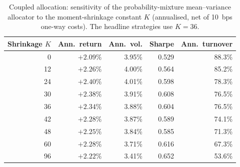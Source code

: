 \begin{table}[H]
\centering
\caption{Coupled allocation: sensitivity of the probability-mixture mean--variance allocator
to the moment-shrinkage constant $K$ (annualised, net of 10~bps one-way costs). The headline
strategies use $K=36$.}
\label{tab:c-shrinkage}
\small
\begin{tabular}{rrrrr}
\toprule
Shrinkage $K$ & Ann.\ return & Ann.\ vol. & Sharpe & Ann.\ turnover \\
\midrule
0  & $+2.09\%$ & 3.95\% & 0.529 & 88.3\% \\
12 & $+2.26\%$ & 4.00\% & 0.564 & 85.2\% \\
24 & $+2.40\%$ & 4.01\% & 0.598 & 78.3\% \\
30 & $+2.38\%$ & 3.91\% & 0.608 & 76.5\% \\
36 & $+2.34\%$ & 3.88\% & 0.604 & 76.5\% \\
42 & $+2.28\%$ & 3.87\% & 0.589 & 74.1\% \\
48 & $+2.25\%$ & 3.84\% & 0.585 & 71.3\% \\
60 & $+2.28\%$ & 3.71\% & 0.616 & 67.3\% \\
96 & $+2.22\%$ & 3.41\% & 0.652 & 53.6\% \\
\bottomrule
\end{tabular}
\end{table}

